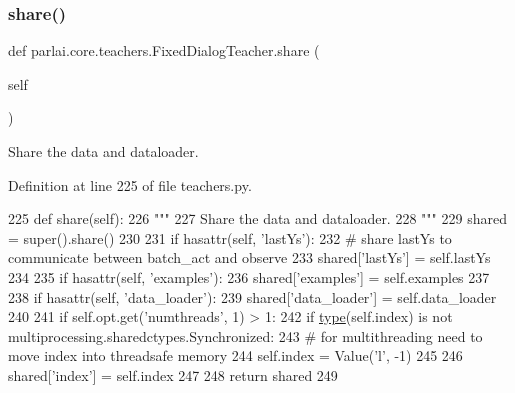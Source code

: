 \subsubsection{\texorpdfstring{share()}{share()}}
{\footnotesize\ttfamily def parlai.\+core.\+teachers.\+Fixed\+Dialog\+Teacher.\+share (\begin{DoxyParamCaption}\item[{}]{self }\end{DoxyParamCaption})}

\begin{DoxyVerb}Share the data and dataloader.
\end{DoxyVerb}
 

Definition at line 225 of file teachers.\+py.


\begin{DoxyCode}
225     \textcolor{keyword}{def }share(self):
226         \textcolor{stringliteral}{"""}
227 \textcolor{stringliteral}{        Share the data and dataloader.}
228 \textcolor{stringliteral}{        """}
229         shared = super().share()
230 
231         \textcolor{keywordflow}{if} hasattr(self, \textcolor{stringliteral}{'lastYs'}):
232             \textcolor{comment}{# share lastYs to communicate between batch\_act and observe}
233             shared[\textcolor{stringliteral}{'lastYs'}] = self.lastYs
234 
235         \textcolor{keywordflow}{if} hasattr(self, \textcolor{stringliteral}{'examples'}):
236             shared[\textcolor{stringliteral}{'examples'}] = self.examples
237 
238         \textcolor{keywordflow}{if} hasattr(self, \textcolor{stringliteral}{'data\_loader'}):
239             shared[\textcolor{stringliteral}{'data\_loader'}] = self.data\_loader
240 
241         \textcolor{keywordflow}{if} self.opt.get(\textcolor{stringliteral}{'numthreads'}, 1) > 1:
242             \textcolor{keywordflow}{if} \hyperlink{namespaceparlai_1_1agents_1_1tfidf__retriever_1_1build__tfidf_ad5dfae268e23f506da084a9efb72f619}{type}(self.index) \textcolor{keywordflow}{is} \textcolor{keywordflow}{not} multiprocessing.sharedctypes.Synchronized:
243                 \textcolor{comment}{# for multithreading need to move index into threadsafe memory}
244                 self.index = Value(\textcolor{stringliteral}{'l'}, -1)
245 
246         shared[\textcolor{stringliteral}{'index'}] = self.index
247 
248         \textcolor{keywordflow}{return} shared
249 
\end{DoxyCode}
\mbox{\label{classparlai_1_1core_1_1teachers_1_1FixedDialogTeacher_a8923ee1255939443c7a6ea1532a2fe40}} 
